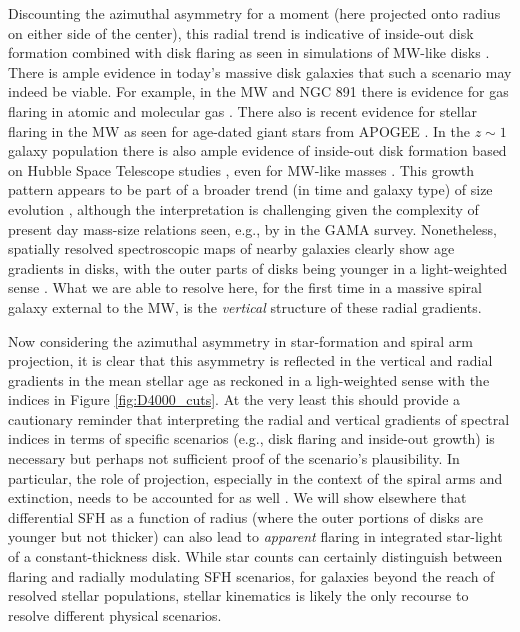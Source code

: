 Discounting the azimuthal asymmetry for a moment (here projected onto
radius on either side of the center), this radial trend is indicative
of inside-out disk formation combined with disk flaring as seen in
simulations of MW-like disks \citep[e.g.,][]{Martig14a}. There is
ample evidence in today's massive disk galaxies that such a scenario
may indeed be viable. For example, in the MW and NGC 891 there is
evidence for gas flaring in atomic and molecular gas \citep[e.g.,][for
  NGC 891]{Scoville93, Yim11}. There also is recent evidence for
stellar flaring in the MW \citep{Ness16} as seen for age-dated giant
stars from APOGEE \citep{Majewski15}. In the $z\sim1$ galaxy
population there is also ample evidence of inside-out disk formation
based on Hubble Space Telescope studies \citep[e.g.,][]{Nelson15},
even for MW-like masses \citep[e.g.,][]{vanDokkum13}. This growth
pattern appears to be part of a broader trend (in time and galaxy
type) of size evolution \citep[e.g.,][]{Shibuya15}, although the
interpretation is challenging given the complexity of present day
mass-size relations seen, e.g., by \citet{Lange15} in the GAMA survey.
Nonetheless, spatially resolved spectroscopic maps of nearby galaxies
clearly show age gradients in disks, with the outer parts of disks
being younger in a light-weighted sense
\citep{Sanchez-Blazquez14,Gonzalez-Delgado15}. What we are able to
resolve here, for the first time in a massive spiral galaxy external
to the MW, is the {\it vertical} structure of these radial gradients.

Now considering the azimuthal asymmetry in star-formation and spiral
arm projection, it is clear that this asymmetry is reflected in the
vertical and radial gradients in the mean stellar age as reckoned in a
ligh-weighted sense with the indices in Figure \ref{fig:D4000_cuts}.
At the very least this should provide a cautionary reminder that
interpreting the radial and vertical gradients of spectral indices in
terms of specific scenarios (e.g., disk flaring and inside-out growth)
is necessary but perhaps not sufficient proof of the scenario's
plausibility. In particular, the role of projection, especially in the
context of the spiral arms and extinction, needs to be accounted for
as well \citep[cf the relative excess of H$\alpha$ vs 24$\mu$
  emission, as discussed in][]{Kamphuis07b}. We will show elsewhere
that differential SFH as a function of radius (where the outer
portions of disks are younger but not thicker) can also lead to {\it
  apparent} flaring in integrated star-light of a constant-thickness
disk. While star counts can certainly distinguish between flaring and
radially modulating SFH scenarios, for galaxies beyond the reach of
resolved stellar populations, stellar kinematics is likely the only
recourse to resolve different physical scenarios.

